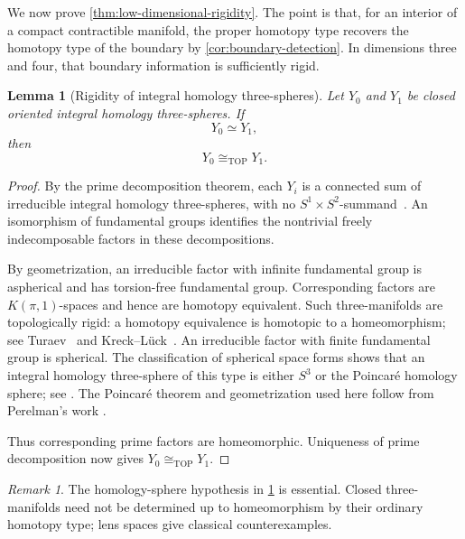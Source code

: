 \documentclass[10pt,reqno]{amsart}
\numberwithin{equation}{section}
\newtheorem{lemma}{Lemma}
\theoremstyle{definition}
\theoremstyle{remark}
\newtheorem{remark}{Remark}
\newcommand{\TOP}{\mathrm{TOP}}
\begin{document}
We now prove \cref{thm:low-dimensional-rigidity}.  The point is that,
for an interior of a compact contractible manifold, the proper
homotopy type recovers the homotopy type of the boundary by
\cref{cor:boundary-detection}.  In dimensions three and four, that
boundary information is sufficiently rigid.

\begin{lemma}[Rigidity of integral homology three-spheres]
\label{lem:homology-three-sphere-rigidity}
Let \(Y_0\) and \(Y_1\) be closed oriented integral homology
three-spheres.  If
\[
Y_0\simeq Y_1,
\]
then
\[
Y_0\cong_{\TOP}Y_1.
\]
\end{lemma}

\begin{proof}
By the prime decomposition theorem, each \(Y_i\) is a connected sum
of irreducible integral homology three-spheres, with no
\(S^1\times S^2\)-summand~\cite{MilnorPrimeDecomposition}.  An
isomorphism of fundamental groups identifies the nontrivial freely
indecomposable factors in these decompositions.

By geometrization, an irreducible factor with infinite fundamental
group is aspherical and has torsion-free fundamental group.
Corresponding factors are \(K(\pi,1)\)-spaces and hence are homotopy
equivalent.  Such three-manifolds are topologically rigid: a homotopy
equivalence is
homotopic to a homeomorphism; see Turaev~\cite{TuraevGeometric} and
Kreck--L\"uck~\cite[Theorem~0.7]{KreckLuckRigidity}.  An irreducible factor with
finite fundamental group is spherical.  The classification of
spherical space forms shows that an integral homology three-sphere of
this type is either \(S^3\) or the Poincar\'e homology sphere; see
\cite{MilnorFreeActions,WolfSpaceForms}.  The Poincar\'e theorem and
geometrization used here follow from Perelman's work
\cite{PerelmanSurgery,PerelmanExtinction}.

Thus corresponding prime factors are homeomorphic.  Uniqueness of
prime decomposition now gives \(Y_0\cong_{\TOP}Y_1\).
\end{proof}

\begin{remark}
The homology-sphere hypothesis in
\cref{lem:homology-three-sphere-rigidity} is essential.  Closed
three-manifolds need not be determined up to homeomorphism by their
ordinary homotopy type; lens spaces give classical counterexamples.
\end{remark}
\end{document}
